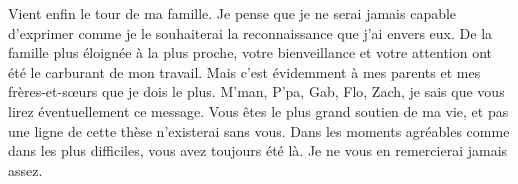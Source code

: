 Vient enfin le tour de ma famille. Je pense que je ne serai jamais capable d'exprimer comme je le souhaiterai la reconnaissance que j'ai envers eux. De la famille plus éloignée à la plus proche, votre bienveillance et votre attention ont été le carburant de mon travail. Mais c'est évidemment à mes parents et mes frères-et-sœurs que je dois le plus. M'man, P'pa, Gab, Flo, Zach, je sais que vous lirez éventuellement ce message. Vous êtes le plus grand soutien de ma vie, et pas une ligne de cette thèse n'existerai sans vous. Dans les moments agréables comme dans les plus difficiles, vous avez toujours été là. Je ne vous en remercierai jamais assez.
